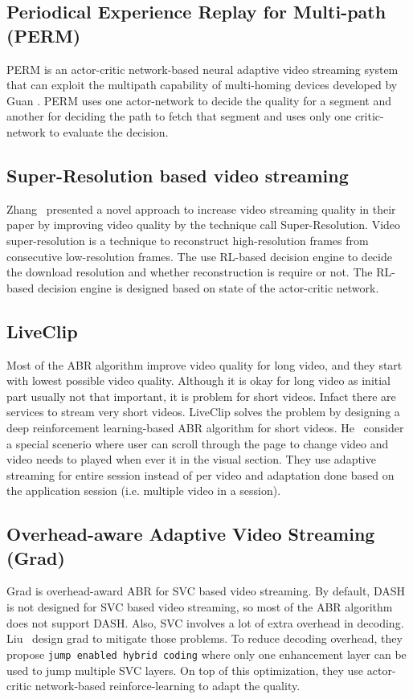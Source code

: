\subsection{Periodical Experience Replay for Multi-path (PERM)}
PERM\cite{9155492} is an actor-critic network-based neural adaptive video streaming system that can exploit the multipath capability of multi-homing devices developed by Guan \etal. PERM uses one actor-network to decide the quality for a segment and another for deciding the path to fetch that segment and uses only one critic-network to evaluate the decision.

\subsection{Super-Resolution based video streaming}
Zhang \etal\ presented a novel approach to increase video streaming quality in their paper \cite{9155384} by improving video quality by the technique call Super-Resolution. Video super-resolution is a technique to reconstruct high-resolution frames from consecutive low-resolution frames. The use RL-based decision engine to decide the download resolution and whether reconstruction is require or not. The RL-based decision engine is designed based on state of the actor-critic network.

\subsection{LiveClip}
Most of the ABR algorithm improve video quality for long video, and they start with lowest possible video quality. Although it is okay for long video as initial part usually not that important, it is problem for short videos. Infact there are services to stream very short videos. LiveClip\cite{10.1145/3386290.3396937} solves the problem by designing a deep reinforcement learning-based ABR algorithm for short videos. He \etal\ consider a special scenerio where user can scroll through the page to change video and video needs to played when ever it in the visual section. They use adaptive streaming for entire session instead of per video and adaptation done based on the application session (i.e. multiple video in a session).

\subsection{Overhead-aware Adaptive Video Streaming (Grad)}
Grad\cite{10.1145/3394171.3413512} is overhead-award ABR for SVC based video streaming. By default, DASH is not designed for SVC based video streaming, so most of the ABR algorithm does not support DASH. Also, SVC involves a lot of extra overhead in decoding. Liu \etal\ design grad to mitigate those problems. To reduce decoding overhead, they propose {\tt jump enabled hybrid coding} where only one enhancement layer can be used to jump multiple SVC layers. On top of this optimization, they use actor-critic network-based reinforce-learning to adapt the quality.

